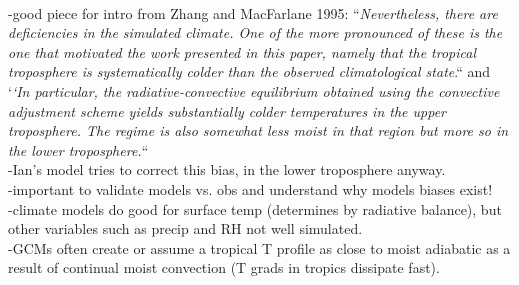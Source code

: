 \documentclass[letterpaper,12pt,titlepage,oneside,final]{book}
\begin{document}
\\
-good piece for intro from Zhang and MacFarlane 1995: ``\textit{Nevertheless, there are deficiencies in the simulated climate. One of the more pronounced of these is the one that motivated the work presented
in this paper, namely that the tropical troposphere is systematically colder than
the observed climatological state}.`` and `\textit{`In particular, the radiative-convective equilibrium obtained using the convective
adjustment scheme yields substantially colder temperatures in the upper
troposphere. The regime is also somewhat less moist in that region but more so in
the lower troposphere.}``
\\
-Ian's model tries to correct this bias, in the lower troposphere anyway.
\\
-important to validate models vs. obs and understand why models biases exist!
\\
-climate models do good for surface temp (determines by radiative balance), but other variables such as precip and RH not well simulated. 
\\
-GCMs often create or assume a tropical T profile as close to moist adiabatic as a result of continual moist convection (T grads in tropics dissipate fast).
\end{document}
